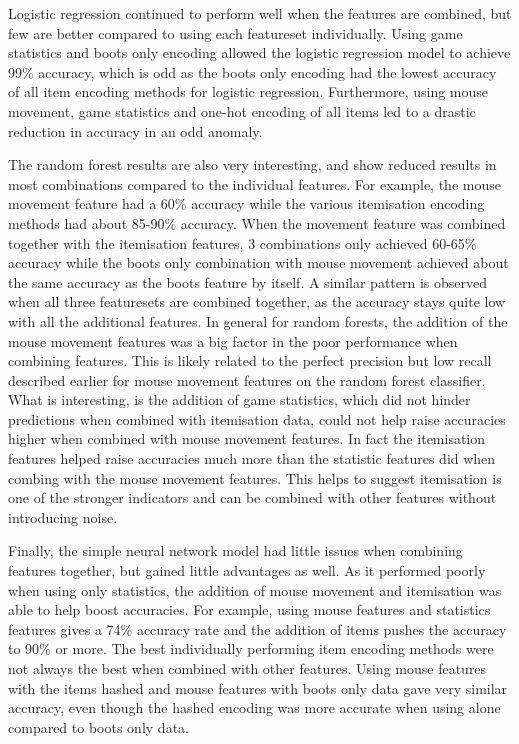 \documentclass[Report.tex]{subfiles}
\begin{document}
Logistic regression continued to perform well when the features are combined, but few are better compared to using each featureset individually. Using game statistics and boots only encoding allowed the logistic regression model to achieve 99\% accuracy, which is odd as the boots only encoding had the lowest accuracy of all item encoding methods for logistic regression. 
Furthermore, using mouse movement, game statistics and one-hot encoding of all items led to a drastic reduction in accuracy in an odd anomaly.  

The random forest results are also very interesting, and show reduced results in most combinations compared to the individual features. For example, the mouse movement feature had a 60\% accuracy while the various itemisation encoding methods had about 85-90\% accuracy. When the movement feature was combined together with the itemisation features, 3 combinations only achieved 60-65\% accuracy while the boots only combination with mouse movement achieved about the same accuracy as the boots feature by itself. A similar pattern is observed when all three featuresets are combined together, as the accuracy stays quite low with all the additional features. In general for random forests, the addition of the mouse movement features was a big factor in the poor performance when combining features. This is likely related to the perfect precision but low recall described earlier for mouse movement features on the random forest classifier. What is interesting, is the addition of game statistics, which did not hinder predictions when combined with itemisation data, could not help raise accuracies higher when combined with mouse movement features. In fact the itemisation features helped raise accuracies much more than the statistic features did when combing with the mouse movement features. This helps to suggest itemisation is one of the stronger indicators and can be combined with other features without introducing noise. %

Finally, the simple neural network model had little issues when combining features together, but gained little advantages as well. As it performed poorly when using only statistics, the addition of mouse movement and itemisation was able to help boost accuracies. For example, using mouse features and statistics features gives a 74\% accuracy rate and the addition of items pushes the accuracy to 90\% or more. The best individually performing item encoding methods were not always the best when combined with other features. Using mouse features with the items hashed and mouse features with boots only data gave very similar accuracy, even though the hashed encoding was more accurate when using alone compared to boots only data.
\end{document}
